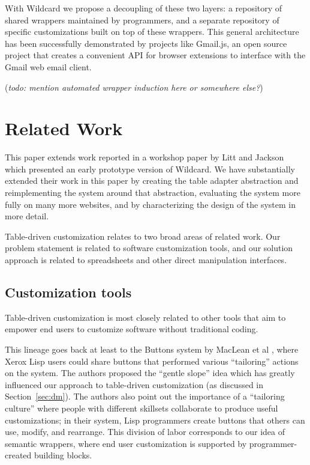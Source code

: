 \documentclass[sigplan,screen,10pt,anonymous,review]{acmart}
\begin{document}
With Wildcard we propose a decoupling of these two layers: a repository
of shared wrappers maintained by programmers, and a separate repository
of specific customizations built on top of these wrappers. This general
architecture has been successfully demonstrated by projects like
Gmail.js, an open source project that creates a convenient API for
browser extensions to interface with the Gmail web email client.

(\emph{todo: mention automated wrapper induction here or somewhere
else?})

\hypertarget{sec:related-work}{%
\section{Related Work}\label{sec:related-work}}

This paper extends work reported in a workshop paper by Litt and Jackson
\citep{litt2020} which presented an early prototype version of Wildcard.
We have substantially extended their work in this paper by creating the
table adapter abstraction and reimplementing the system around that
abstraction, evaluating the system more fully on many more websites, and
by characterizing the design of the system in more detail.

Table-driven customization relates to two broad areas of related work.
Our problem statement is related to software customization tools, and
our solution approach is related to spreadsheets and other direct
manipulation interfaces.

\hypertarget{customization-tools}{%
\subsection{Customization tools}\label{customization-tools}}

Table-driven customization is most closely related to other tools that
aim to empower end users to customize software without traditional
coding.

This lineage goes back at least to the Buttons system by MacLean et al
\citep{maclean1990}, where Xerox Lisp users could share buttons that
performed various ``tailoring'' actions on the system. The authors
proposed the ``gentle slope'' idea which has greatly influenced our
approach to table-driven customization (as discussed in
Section~\ref{sec:dm}). The authors also point out the importance of a
``tailoring culture'' where people with different skillsets collaborate
to produce useful customizations; in their system, Lisp programmers
create buttons that others can use, modify, and rearrange. This division
of labor corresponds to our idea of semantic wrappers, where end user
customization is supported by programmer-created building blocks.
\end{document}
